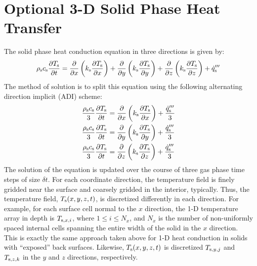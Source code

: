\section{Optional 3-D Solid Phase Heat Transfer}

The solid phase heat conduction equation in three directions is given by:
\begin{equation}
\label{ht3d}
  \rho_{\rm s} c_{\rm s} \frac{\partial T_{\rm s}}{\partial t} = \frac{\partial}{\partial x} \left( k_{\rm s} \frac{\partial T_{\rm s}}{\partial x} \right) +
                                                                 \frac{\partial}{\partial y} \left( k_{\rm s} \frac{\partial T_{\rm s}}{\partial y} \right) +
                                                                 \frac{\partial}{\partial z} \left( k_{\rm s} \frac{\partial T_{\rm s}}{\partial z} \right) + \dot{q}'''_{\rm s}
\end{equation}
The method of solution is to split this equation using the following alternating direction implicit (ADI) scheme:
\begin{align}
\label{ht3d_xyz}
 \frac{ \rho_{\rm s} c_{\rm s}}{3} \frac{\partial T_{{\rm s}}}{\partial t} & = \frac{\partial}{\partial x} \left( k_{\rm s} \frac{\partial T_{{\rm s}}}{\partial x} \right) + \frac{\dot{q}'''_{\rm s}}{3} \\
 \frac{ \rho_{\rm s} c_{\rm s}}{3} \frac{\partial T_{{\rm s}}}{\partial t} & = \frac{\partial}{\partial y} \left( k_{\rm s} \frac{\partial T_{{\rm s}}}{\partial y} \right) + \frac{\dot{q}'''_{\rm s}}{3} \\
 \frac{ \rho_{\rm s} c_{\rm s}}{3} \frac{\partial T_{{\rm s}}}{\partial t} & = \frac{\partial}{\partial z} \left( k_{\rm s} \frac{\partial T_{{\rm s}}}{\partial z} \right) + \frac{\dot{q}'''_{\rm s}}{3}
\end{align}
The solution of the equation is updated over the course of three gas phase time steps of size $\delta t$. For each coordinate direction, the temperature field is finely gridded near the surface and coarsely gridded in the interior, typically. Thus, the temperature field, $T_{\rm s}(x,y,z,t)$, is discretized differently in each direction. For example, for each surface cell normal to the $x$ direction, the 1-D temperature array in depth is $T_{{\rm s},x,i}$, where $1\le i \le N_x$, and $N_x$ is the number of non-uniformly spaced internal cells spanning the entire width of the solid in the $x$ direction. This is exactly the same approach taken  above for 1-D heat conduction in solids with ``exposed'' back surfaces. Likewise, $T_{\rm s}(x,y,z,t)$ is discretized $T_{{\rm s},y,j}$ and $T_{{\rm s},z,k}$ in the $y$ and $z$ directions, respectively.

